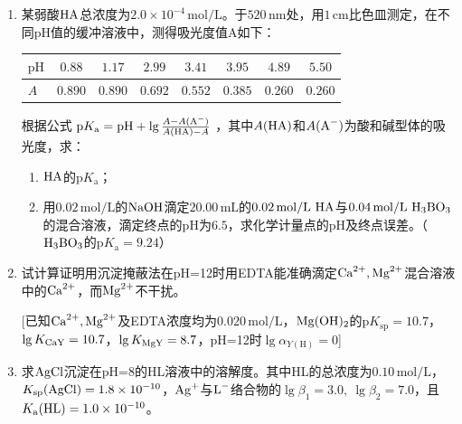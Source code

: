 \begin{enumerate}
    \item 某弱酸$\ce{HA}$总浓度为$2.0\times10^{-4}\,\mathrm{mol/L}$。于$520\,\mathrm{nm}$处，用$1\,\mathrm{cm}$比色皿测定，在不同pH值的缓冲溶液中，测得吸光度值A如下：
    \begin{center}
    \begin{tabular}{|l|ccccccc|}
    \hline
    $\text{pH}$ & $0.88$ & $1.17$ & $2.99$ & $3.41$ & $3.95$ & $4.89$ & $5.50$ \\
    \hline
    $A$ & $0.890$ & $0.890$ & $0.692$ & $0.552$ & $0.385$ & $0.260$ & $0.260$ \\
    \hline
    \end{tabular}
    \end{center}
    根据公式 $\text{p}K_\text{a} = \text{pH} + \lg\frac{A - A(\ce{A-})}{A(\ce{HA}) - A}$ ，其中$A(\ce{HA})$和$A(\ce{A-})$为酸和碱型体的吸光度，求：
    \begin{enumerate}
        \item $\ce{HA}$的$\text{p}K_\text{a}$；
        \item 用$0.02\,\mathrm{mol/L}$的$\ce{NaOH}$滴定$20.00\,\mathrm{mL}$的$0.02\,\mathrm{mol/L}\ \ce{HA}$与$0.04\,\mathrm{mol/L}\ \ce{H3BO3}$的混合溶液，滴定终点的pH为$6.5$，求化学计量点的pH及终点误差。（$\ce{H3BO3}$的$\text{p}K_\text{a}=9.24$）
    \end{enumerate}
    \item 试计算证明用沉淀掩蔽法在pH=12时用EDTA能准确滴定$\ce{Ca^{2+}, Mg^{2+}}$混合溶液中的$\ce{Ca^{2+}}$，而$\ce{Mg^{2+}}$不干扰。
    
    [已知$\ce{Ca^{2+}, Mg^{2+}}$及EDTA浓度均为$0.020\,\mathrm{mol/L}$，$\ce{Mg(OH)2}$的$\text{p}K_\text{sp}=10.7$，$\lg K_{\ce{CaY}}=10.7$，$\lg K_{\ce{MgY}}=8.7$，pH=12时$\lg\alpha_{Y(\text{H})}=0$]
    \item 求$\ce{AgCl}$沉淀在pH=8的HL溶液中的溶解度。其中HL的总浓度为$0.10\,\mathrm{mol/L}$，$K_\text{sp}(\ce{AgCl})=1.8\times10^{-10}$，$\ce{Ag+}$与$\ce{L-}$络合物的$\lg\beta_1=3.0,\ \lg\beta_2=7.0$，且$K_\text{a}(\ce{HL})=1.0\times10^{-10}$。
\end{enumerate}